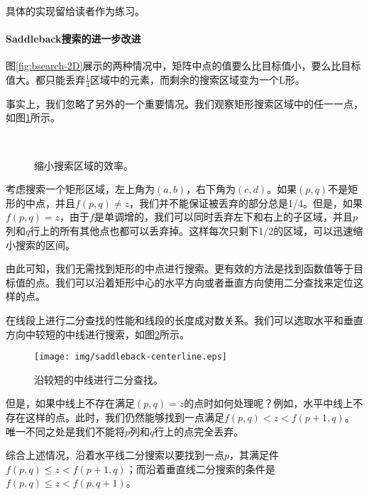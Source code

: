 \documentclass[UTF8]{article}
\begin{document}
具体的实现留给读者作为练习。

\paragraph{Saddleback搜索的进一步改进}

图\ref{fig:bsearch-2D}展示的两种情况中，矩阵中点的值要么比目标值小，要么比目标值大。都只能丢弃$\frac{1}{4}$区域中的元素，而剩余的搜索区域变为一个L形。

事实上，我们忽略了另外的一个重要情况。我们观察矩形搜索区域中的任一一点，如图\ref{fig:saddleback-drop}所示。

\begin{figure}[htbp]
 \centering
  \\
 \caption{缩小搜索区域的效率。}
 \label{fig:saddleback-drop}
\end{figure}

考虑搜索一个矩形区域，左上角为$(a, b)$，右下角为$(c, d)$。如果$(p, q)$不是矩形的中点，并且$f(p, q) \neq z$，我们并不能保证被丢弃的部分总是1/4。但是，如果$f(p, q) = z$，由于$f$是单调增的，我们可以同时丢弃左下和右上的子区域，并且$p$列和$q$行上的所有其他点也都可以丢弃掉。这样每次只剩下1/2的区域，可以迅速缩小搜索的区间。

由此可知，我们无需找到矩形的中点进行搜索。更有效的方法是找到函数值等于目标值的点。我们可以沿着矩形中心的水平方向或者垂直方向使用二分查找来定位这样的点。

在线段上进行二分查找的性能和线段的长度成对数关系。我们可以选取水平和垂直方向中较短的中线进行搜索，如图\ref{fig:saddleback-centerline}所示。

\begin{figure}[htbp]
 \centering
 \texttt{[image: img/saddleback-centerline.eps]}
 \caption{沿较短的中线进行二分查找。}
 \label{fig:saddleback-centerline}
\end{figure}

但是，如果中线上不存在满足$(p, q) = z$的点时如何处理呢？例如，水平中线上不存在这样的点。此时，我们仍然能够找到一点满足$f(p, q) < z < f(p+1, q)$。唯一不同之处是我们不能将$p$列和$q$行上的点完全丢弃。

综合上述情况，沿着水平线二分搜索以要找到一点$p$，其满足件$f(p, q) \leq z < f(p+1, q)$；而沿着垂直线二分搜索的条件是$f(p, q) \leq z < f(p, q + 1)$。
\end{document}

